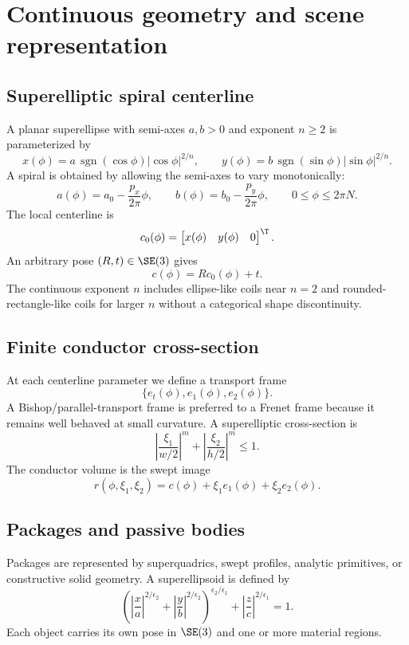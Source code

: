 \section{Continuous geometry and scene representation}

\subsection{Superelliptic spiral centerline}

A planar superellipse with semi-axes $a,b>0$ and exponent $n\ge 2$ is
parameterized by
\[
 x(\phi)=a\,\operatorname{sgn}(\cos\phi)|\cos\phi|^{2/n},\qquad
 y(\phi)=b\,\operatorname{sgn}(\sin\phi)|\sin\phi|^{2/n}.
\]
A spiral is obtained by allowing the semi-axes to vary monotonically:
\[
 a(\phi)=a_0-\frac{p_x}{2\pi}\phi,\qquad
 b(\phi)=b_0-\frac{p_y}{2\pi}\phi,\qquad
 0\le\phi\le 2\pi N .
\]
The local centerline is
\[
  c_0(\phi)=\begin{bmatrix}x(\phi)&y(\phi)&0\end{bmatrix}^{\T}.
\]
An arbitrary pose $(R,t)\in\SE(3)$ gives
\[
  c(\phi)=Rc_0(\phi)+t.
\]
The continuous exponent $n$ includes ellipse-like coils near $n=2$ and
rounded-rectangle-like coils for larger $n$ without a categorical shape
discontinuity.

\subsection{Finite conductor cross-section}

At each centerline parameter we define a transport frame
\[
  \{e_t(\phi),e_1(\phi),e_2(\phi)\}.
\]
A Bishop/parallel-transport frame is preferred to a Frenet frame because it
remains well behaved at small curvature. A superelliptic cross-section is
\[
 \left|\frac{\xi_1}{w/2}\right|^{m}
 +\left|\frac{\xi_2}{h/2}\right|^{m}\le 1.
\]
The conductor volume is the swept image
\[
  r(\phi,\xi_1,\xi_2)
  =c(\phi)+\xi_1 e_1(\phi)+\xi_2 e_2(\phi).
\]

\subsection{Packages and passive bodies}

Packages are represented by superquadrics, swept profiles, analytic primitives,
or constructive solid geometry. A superellipsoid is defined by
\[
 \left(
   \left|\frac{x}{a}\right|^{2/\epsilon_2}
  +\left|\frac{y}{b}\right|^{2/\epsilon_2}
 \right)^{\epsilon_2/\epsilon_1}
 +\left|\frac{z}{c}\right|^{2/\epsilon_1}=1.
\]
Each object carries its own pose in $\SE(3)$ and one or more material regions.

